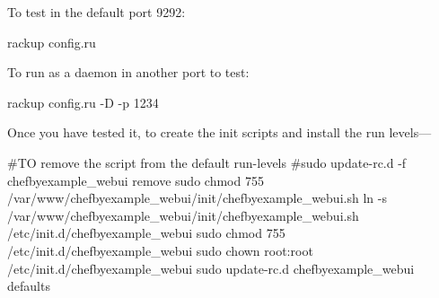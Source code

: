 To test in the default port 9292:
\begin{codelisting}
\label{code:}
\codecaption{}
\begin{code}
rackup config.ru
\end{code}
\end{codelisting}

To run as a daemon in another port to test:
\begin{codelisting}
\label{code:}
\codecaption{}
\begin{code}
rackup config.ru -D -p 1234
\end{code}
\end{codelisting}

Once you have tested it, to create the init scripts and install the run levels---
\begin{codelisting}
\label{code:}
\codecaption{}
\begin{code}
#TO remove the script from the default run-levels
#sudo update-rc.d -f chefbyexample_webui remove
sudo chmod 755 /var/www/chefbyexample_webui/init/chefbyexample_webui.sh
ln -s /var/www/chefbyexample_webui/init/chefbyexample_webui.sh /etc/init.d/chefbyexample_webui
sudo chmod 755 /etc/init.d/chefbyexample_webui
sudo chown root:root /etc/init.d/chefbyexample_webui
sudo update-rc.d chefbyexample_webui defaults
\end{code}
\end{codelisting}